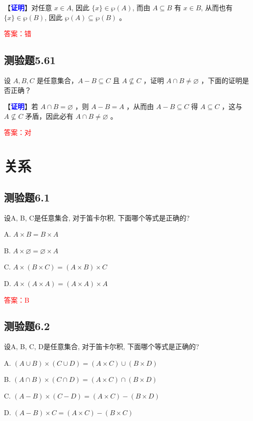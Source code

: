 \documentclass[UTF8, heading=true]{ctexart}
\begin{document}
【\textcolor{blue}{\textbf{证明}}】对任意 $x \in A$, 因此 $\{x\} \in \wp(A)$, 而由 $A \subseteq B$ 有 $x \in B$, 从而也有 $\{x\} \in \wp(B)$, 因此 $\wp(A) \subseteq \wp(B)$ 。

\textcolor{red}{答案：错}

\subsection{测验题5.61}

设 $A, B, C$ 是任意集合，$A-B \subseteq C$ 且 $A \nsubseteq C$ ，证明 $A \cap B \neq \varnothing$ ，下面的证明是否正确？

【\textcolor{blue}{\textbf{证明}}】若 $A \cap B=\varnothing$ ，则 $A-B=A$ ，从而由 $A-B \subseteq C$ 得 $A \subseteq C$ ，这与 $A \nsubseteq C$ 矛盾，因此必有 $A \cap B \neq \varnothing$ 。


\textcolor{red}{答案：对}

\clearpage

\section{关系}

\subsection{测验题6.1}

设A, B, C是任意集合, 对于笛卡尔积, 下面哪个等式是正确的?

A. 
$
A \times B=B \times A
$

B. 
$
A \times \varnothing=\varnothing \times A
$

C. 
$
A \times(B \times C)=(A \times B) \times C
$

D. 
$
A \times(A \times A)=(A \times A) \times A
$

\textcolor{red}{答案：B}


\subsection{测验题6.2}
设A, B, C, D是任意集合, 对于笛卡尔积, 下面哪个等式是正确的?

A. 
$
(A \cup B) \times(C \cup D)=(A \times C) \cup(B \times D)
$

B. 
$
(A \cap B) \times(C \cap D)=(A \times C) \cap(B \times D)
$

C. 
$
(A-B) \times(C-D)=(A \times C)-(B \times D)
$

D. 
$
(A-B) \times C=(A \times C)-(B \times C)
$
\end{document}
